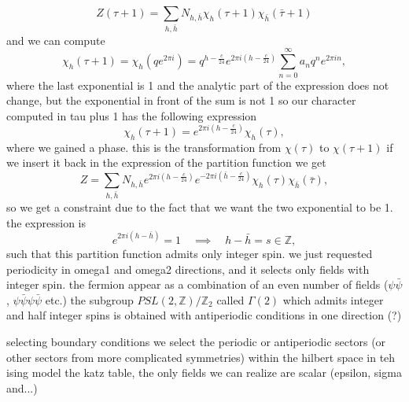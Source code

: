 \[
    Z(\tau+1) = \sum_{h,\bar{h}} N_{h,\bar{h}}\chi_h(\tau + 1)\chi_{\bar{h}}(\bar{\tau} + 1)
\]
and we can compute
\[
    \chi_h (\tau+1) = \chi_h (q e^{2\pi i}) = q^{h - \frac{c}{24}} e^{2 \pi i (h - \frac{c}{24})}\sum_{n=0}^{\infty} a_n q^n e^{2 \pi i n},
\]
where the last exponential is 1 and the analytic part of the expression does not change, but the exponential in front of the sum is not 1
so our character computed in tau plus 1 has the following expression
\[
    \chi_h (\tau+1) = e^{2 \pi i (h - \frac{c}{24})} \chi_h(\tau),
\]
where we gained a phase. this is the transformation from \(\chi(\tau)\) to \(\chi(\tau + 1)\)
if we insert it back in the expression of the partition function we get
\[
    Z = \sum_{h, \bar{h}} N_{h,\bar{h}} e^{2 \pi i (h - \frac{c}{24})} e^{-2 \pi i(\bar{h}-\frac{c}{24})} \chi_h(\tau)\chi_{\bar{h}}(\bar{\tau}),
\]
so we get a constraint due to the fact that we want the two exponential to be 1. the expression is
\[
    e^{2\pi i (h - \bar{h})} = 1 \quad \implies \quad h - \bar{h} = s \in \mathbb{Z},
\]
such that this partition function admits only integer spin. we just requested periodicity in omega1 and omega2 directions, and it selects only fields with integer spin.
the fermion appear as a combination of an even number of fields (\(\psi \bar{\psi}\), \(\psi\bar{\psi}\psi\bar{\psi}\) etc.)
the subgroup \(PSL(2,\mathbb{Z})/\mathbb{Z}_2\) called \(\Gamma(2)\) which admits integer and half integer spins is obtained with antiperiodic conditions in one direction (?)

selecting boundary conditions we select the periodic or antiperiodic sectors (or other sectors from more complicated symmetries) within the hilbert space
in teh ising model the katz table, the only fields we can realize are scalar (epsilon, sigma and...)

